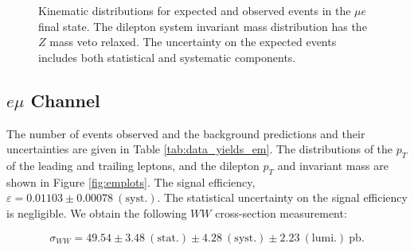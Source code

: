 \begin{figure}[!hbtp]
\begin{center}
\caption{Kinematic distributions for expected and observed events in the $\mu{e}$ final state.
The dilepton system invariant mass distribution has the $Z$ mass veto relaxed.
The uncertainty on the expected events includes both statistical and systematic components.}
\label{fig:meplots}
\end{center}
\end{figure}

%
%
%
\clearpage
\subsection{$e \mu$ Channel}

The number of events observed and the background predictions and their uncertainties are
given in Table \ref{tab:data_yields_em}.
The distributions of the $p_{T}$ of the leading and trailing leptons, and the dilepton $p_{T}$
and invariant mass are shown in Figure \ref{fig:emplots}.
The signal efficiency,  $\varepsilon = 0.01103 \pm 0.00078~\mathrm{(syst.)}$.
The statistical uncertainty on the signal efficiency is negligible.
We obtain the following $WW$ cross-section measurement:

\begin{equation*}
\sigma_{WW}  = 49.54 \pm 3.48~\mathrm{(stat.)} \pm 4.28~\mathrm{(syst.)} \pm 2.23~\mathrm{(lumi.)~pb}. 
\end{equation*}

